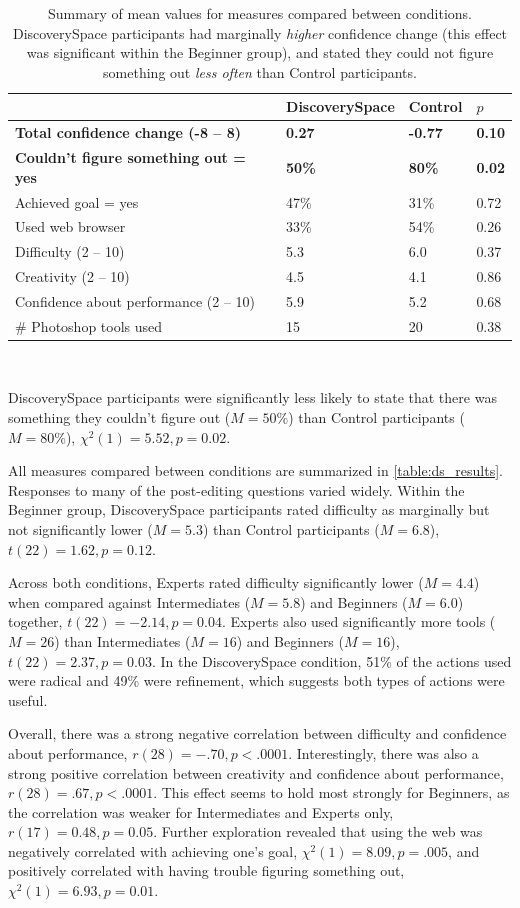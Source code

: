 \begin{table}[]
\centering
\begin{tabular}{l|l|l|l}
 & DiscoverySpace & Control & $p$ \\ \hline
\textbf{Total confidence change (-8 – 8)} & \textbf{0.27} & \textbf{-0.77} & \textbf{0.10} \\
\textbf{Couldn’t figure something out = yes} & \textbf{50\%} & \textbf{80\%} & \textbf{0.02} \\
Achieved goal = yes & 47\% & 31\% & 0.72 \\
Used web browser & 33\% & 54\% & 0.26 \\
Difficulty (2 – 10) & 5.3 & 6.0 & 0.37 \\
Creativity (2 – 10) & 4.5 & 4.1 & 0.86 \\
Confidence about performance (2 – 10) & 5.9 & 5.2 & 0.68 \\
\# Photoshop tools used & 15 & 20 & 0.38
\end{tabular}
\caption{Summary of mean values for measures compared between conditions. Discovery\-Space participants had marginally \textit{higher} confidence change (this effect was significant within the Beginner group), and stated they could not figure something out \textit{less often} than Control participants.}~\label{table:ds_results}
\end{table}

Discovery\-Space participants were significantly less likely to state that there was something they couldn't figure out ($M = 50\%$) than Control participants ($M = 80\%$), $\chi^2(1) = 5.52, p = 0.02$. 

All measures compared between conditions are summarized in \autoref{table:ds_results}. Responses to many of the post-editing questions varied widely. Within the Beginner group, Discovery\-Space participants rated difficulty as marginally but not significantly lower ($M = 5.3$) than Control participants ($M = 6.8$), $t(22) = 1.62, p = 0.12$. 

Across both conditions, Experts rated difficulty significantly lower ($M = 4.4$) when compared against Intermediates ($M = 5.8$) and Beginners ($M = 6.0$) together, $t(22) = -2.14, p = 0.04$. Experts also used significantly more tools ($M = 26$) than Intermediates ($M = 16$) and Beginners ($M = 16$), $t(22) = 2.37, p = 0.03$. In the Discovery\-Space condition, 51\% of the actions used were radical and 49\% were refinement, which suggests both types of actions were useful.

Overall, there was a strong negative correlation between difficulty and confidence about performance, $r(28) = -.70, p < .0001$. Interestingly, there was also a strong positive correlation between creativity and confidence about performance, $r(28) = .67, p < .0001$.  This effect seems to hold most strongly for Beginners, as the correlation was weaker for Intermediates and Experts only, $r(17) = 0.48, p = 0.05$. Further exploration revealed that using the web was negatively correlated with achieving one's goal, $\chi^2(1) = 8.09, p = .005$, and positively correlated with having trouble figuring something out, $\chi^2(1) = 6.93, p = 0.01$.

